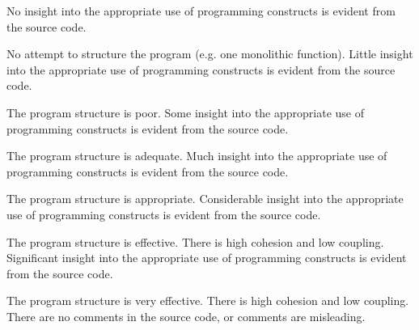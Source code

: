 \documentclass{../../fal_assignment}
\begin{document}
\begin{markingrubric}
	\grade\fail No insight into the appropriate use of programming constructs is evident from the source code.
	\par No attempt to structure the program (e.g. one monolithic function).
	\grade Little insight into the appropriate use of programming constructs is evident from the source code.
	\par The program structure is poor.
	\grade Some insight into the appropriate use of programming constructs is evident from the source code.
	\par The program structure is adequate.
	\grade Much insight into the appropriate use of programming constructs is evident from the source code.
	\par The program structure is appropriate.
	\grade Considerable insight into the appropriate use of programming constructs is evident from the source code.
	\par The program structure is effective. There is high cohesion and low coupling.
	\grade Significant insight into the appropriate use of programming constructs is evident from the source code.
	\par The program structure is very effective. There is high cohesion and low coupling.
	\grade\fail There are no comments in the source code, or comments are misleading.

\end{markingrubric}
\end{document}
